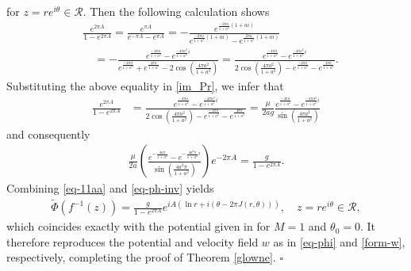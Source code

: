 \documentclass[11pt, letterpaper, reqno]{amsart}
\numberwithin{equation}{section}
\theoremstyle{definition}
\theoremstyle{plain}
\numberwithin{equation}{section}
\def\RR{\mathcal{R}}
\begin{document}
for $z=re^{i\theta}\in \RR$. Then the following calculation shows
\begin{align*}
& \frac{e^{2\pi A}}{1-e^{2\pi A}} = \frac{e^{\pi A}}{e^{-\pi A}-e^{\pi A}} = -\frac{e^{\frac{-2\pi a}{1+a^{2}}(1+ai)}}{e^{\frac{-2\pi a}{1+a^{2}}(1+ai)} - e^{\frac{2\pi a}{1+a^{2}}(1+ai)}} \\
& \quad = -\frac{e^{\frac{-4\pi a}{1+a^{2}}} - e^{\frac{-4\pi a^{2}}{1+a^{2}}i}}{e^{\frac{-4\pi a}{1+a^{2}}} + e^{\frac{4\pi a}{1+a^{2}}} - 2\cos\left(\frac{4\pi a^{2}}{1+a^{2}}\right)}
 = \frac{e^{\frac{-4\pi a}{1+a^{2}}} - e^{\frac{-4\pi a^{2}}{1+a^{2}}i}}{2\cos\left(\frac{4\pi a^{2}}{1+a^{2}}\right) - e^{\frac{-4\pi a}{1+a^{2}}} - e^{\frac{4\pi a}{1+a^{2}}}}.
\end{align*}
Substituting the above equality in \eqref{im_Pr}, we infer that
\begin{align*}
\frac{e^{2\pi A}}{1-e^{2\pi A}} & = \frac{e^{\frac{-4\pi a}{1+a^{2}}} - e^{\frac{-4\pi a^{2}}{1+a^{2}}i}}{2\cos\left(\frac{4\pi a^{2}}{1+a^{2}}\right) - e^{\frac{-4\pi a}{1+a^{2}}} - e^{\frac{4\pi a}{1+a^{2}}}}
 = \frac{\mu}{2ag}\frac{e^{\frac{-4\pi a}{1+a^{2}}} - e^{\frac{-4\pi a^{2}}{1+a^{2}}i}}{\sin\left(\frac{4\pi a^2}{1+a^2}\right)}
\end{align*}
and consequently
\begin{align}\label{eq-11aa}
\frac{\mu}{2a}\left(\frac{e^{-\frac{4a\pi}{1+a^{2}}} - e^{-\frac{4a^{2}\pi}{1+a^{2}} i}}{\sin\left(\frac{4a^{2}\pi}{1+a^{2}}\right)}\right) e^{-2\pi A}
=\frac{g}{1-e^{2\pi A}}.
\end{align}
Combining \eqref{eq-11aa} and \eqref{eq-ph-inv} yields
\begin{align*}
\tilde \Phi(f^{-1}(z)) = \frac{g}{1-e^{2\pi A}}e^{iA(\ln r + i(\theta - 2\pi J(r,\theta)))}, \quad z=re^{i\theta}\in\RR,
\end{align*}
which coincides exactly with the potential given in \cite[eq. (1.31)]{CKO} for $M=1$ and $\theta_0=0$. It therefore reproduces the potential and velocity field $w$ as in \eqref{eq-phi} and \eqref{form-w}, respectively, completing the proof of Theorem \ref{glowne}.  \hfill $\square$
\end{document}
